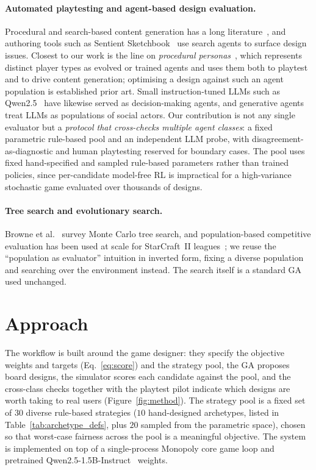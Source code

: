 \documentclass[10pt]{article}
\begin{document}
\paragraph{Automated playtesting and agent-based design evaluation.}
Procedural and search-based content generation has a long
literature~\cite{togelius_pcg}, and authoring tools such as Sentient
Sketchbook~\cite{liapis_sentient} use search agents to surface design
issues. Closest to our work is the line on \emph{procedural
personas}~\cite{holmgard_personas}, which represents distinct player
types as evolved or trained agents and uses them both to playtest and
to drive content generation; optimising a design against such an agent
population is established prior art. Small instruction-tuned LLMs such
as Qwen2.5~\cite{qwen25} have likewise served as decision-making
agents, and generative agents~\cite{park_generative_agents} treat LLMs
as populations of social actors. Our contribution is not any single
evaluator but a \emph{protocol that cross-checks multiple agent
classes}: a fixed parametric rule-based pool and an independent LLM
probe, with disagreement-as-diagnostic and human playtesting reserved
for boundary cases. The pool uses fixed
hand-specified and sampled rule-based parameters rather than trained
policies, since per-candidate model-free RL is impractical for a
high-variance stochastic game evaluated over thousands of designs.

\paragraph{Tree search and evolutionary search.} Browne et
al.~\cite{browne_mcts} survey Monte Carlo tree search, and
population-based competitive evaluation has been used at scale for
StarCraft~II leagues~\cite{alphastar}; we reuse the ``population as
evaluator'' intuition in inverted form, fixing a diverse population
and searching over the environment instead. The search itself is a
standard GA~\cite{ga-goldberg} used unchanged.

\section{Approach}\label{sec:approach}

The workflow is built around the game designer: they specify the
objective weights and targets (Eq.~\ref{eq:score}) and the strategy
pool, the GA proposes board designs, the simulator scores each
candidate against the pool, and the cross-class checks together with
the playtest pilot indicate which designs are worth taking to real
users (Figure~\ref{fig:method}). The strategy pool is a fixed set of
$30$ diverse rule-based strategies ($10$ hand-designed archetypes,
listed in Table~\ref{tab:archetype_defs}, plus $20$ sampled from the
parametric space), chosen so that worst-case fairness across the pool
is a meaningful objective. The system is
implemented on top of a single-process Monopoly core game loop and
pretrained Qwen2.5-1.5B-Instruct~\cite{qwen25} weights.
\end{document}
